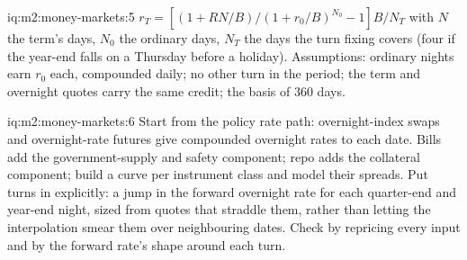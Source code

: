 \begin{solution}{iq:m2:money-markets:5}
$r_T = [(1 + R N/B)/(1 + r_0/B)^{N_0} - 1] B/N_T$ with $N$ the term's days,
$N_0$ the ordinary days, $N_T$ the days the turn fixing covers (four if the
year-end falls on a Thursday before a holiday). Assumptions: ordinary nights
earn $r_0$ each, compounded daily; no other turn in the period; the term and
overnight quotes carry the same credit; the basis of 360 days.
\end{solution}

\begin{solution}{iq:m2:money-markets:6}
Start from the policy rate path: overnight-index swaps and overnight-rate
futures give compounded overnight rates to each date. Bills add the
government-supply and safety component; repo adds the collateral component;
build a curve per instrument class and model their spreads. Put turns in
explicitly: a jump in the forward overnight rate for each quarter-end and
year-end night, sized from quotes that straddle them, rather than letting
the interpolation smear them over neighbouring dates. Check by repricing
every input and by the forward rate's shape around each turn.
\end{solution}
